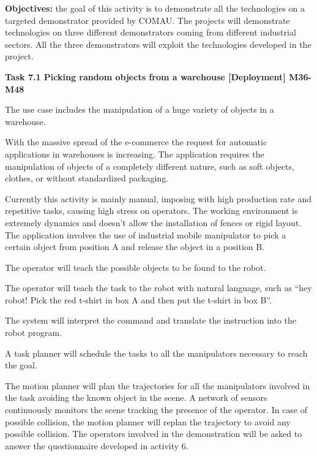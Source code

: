 
\begin{planactivitybody}
\textbf{Objectives:} the goal of this activity is to demonstrate all the
 technologies on a targeted demonstrator provided by
COMAU. The projects will demonstrate technologies on three different
demonstrators coming from different industrial sectors. All the three
demonstrators will exploit the technologies developed in the project.

\plantaskskip
\textbf{Task 7.1 Picking random objects from a warehouse
{[}Deployment{]} M36-M48}

The use case includes the manipulation of a huge variety of objects in a
warehouse.

With the massive spread of the e-commerce the request for automatic
applications in warehouses is increasing. The application requires the
manipulation of objects of a completely different nature, such as soft
objects, clothes, or without standardized packaging.

Currently this activity is mainly manual, imposing with high production
rate and repetitive tasks, causing high stress on operators. The working
environment is extremely dynamics and doesn't allow the installation of
fences or rigid layout. The application involves the use of industrial
mobile manipulator to pick a certain object from position A and release
the object in a position B.

The operator will teach the possible objects to be found to the robot.

The operator will teach the task to the robot with natural language,
such as ``hey robot! Pick the red t-shirt in box A and then put the
t-shirt in box B''.

The system will interpret the command and translate the instruction into
the robot program.

A task planner will schedule the tasks to all the manipulators necessary
to reach the goal.

The motion planner will plan the trajectories for all the manipulators
involved in the task avoiding the known object in the scene. A network
of sensors continuously monitors the scene tracking the presence of the
operator. In case of possible collision, the motion planner will replan
the trajectory to avoid any possible collision. The operators involved
in the demonstration will be asked to answer the questionnaire developed
in activity 6.


\end{planactivitybody}
